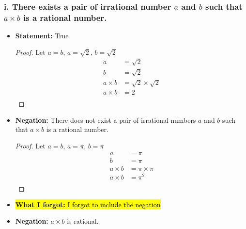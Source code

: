 \documentclass{article}
\begin{document}
\subsubsection*{i. There exists a pair of irrational number $a$ and $b$ such that $a \times b$ is a rational number.}
\begin{itemize}
    \item[] \textbf{Statement: } True
    \begin{proof}
        Let $a = b$, $a = \sqrt{2}$, $b = \sqrt{2}$
           \begin{align*}
               a &= \sqrt{2} \\
               b &= \sqrt{2} \\
               a \times b &= \sqrt{2} \times \sqrt{2} \\
               a \times b &= 2 \\
           \end{align*}
   \end{proof}
    \item[] \textbf{Negation: } There does not exist a pair of irrational numbers $a$ and $b$ such that $a \times b$ is a rational number.
    \begin{proof}
        Let $a = b$, $a = \pi$, $b = \pi$
           \begin{align*}
               a &= \pi \\
               b &= \pi \\
               a \times b &= \pi \times \pi \\
               a \times b &= \pi^2 \\
           \end{align*}
    \end{proof}
    \item[] \hl{\textbf{What I forgot:} I forgot to include the negation}
    \item[] \textbf{Negation:} $a \times b$ is rational.
\end{itemize}
\end{document}
